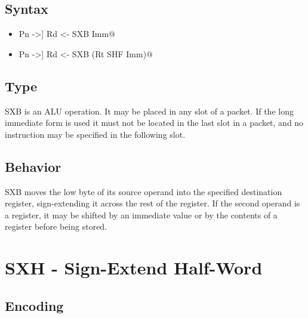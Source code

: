 \documentclass[11pt,openany]{report}
\begin{document}
\subsection{Syntax}

\begin{itemize}
  \item \verb@[[!]Pn ->] Rd <- SXB Imm@
  \item \verb@[[!]Pn ->] Rd <- SXB (Rt SHF Imm)@
\end{itemize}

\subsection{Type}
SXB is an ALU operation. It may be placed in any slot of a packet. If the long immediate form is used it must not be located in the last slot in a packet, and no instruction may be specified in the following slot.

\subsection{Behavior}
SXB moves the low byte of its source operand into the specified destination register, sign-extending it across the rest of the register. If the second operand is a register, it may be shifted by an immediate value or by the contents of a register before being stored.


\pagebreak
\section{SXH - Sign-Extend Half-Word}
\label{sec:sxhinst}

\subsection{Encoding}
\end{document}
